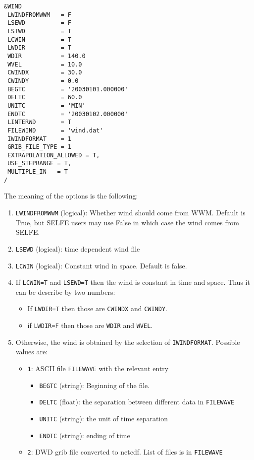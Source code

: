 \documentclass[12pt]{amsart}
\begin{document}
\begin{verbatim}
&WIND
 LWINDFROMWWM   = F      
 LSEWD          = F      
 LSTWD          = T      
 LCWIN          = T      
 LWDIR          = T      
 WDIR           = 140.0  
 WVEL           = 10.0   
 CWINDX         = 30.0   
 CWINDY         = 0.0    
 BEGTC          = '20030101.000000'
 DELTC          = 60.0             
 UNITC          = 'MIN'            
 ENDTC          = '20030102.000000'
 LINTERWD       = T                
 FILEWIND       = 'wind.dat'       
 IWINDFORMAT    = 1                
 GRIB_FILE_TYPE = 1
 EXTRAPOLATION_ALLOWED = T,
 USE_STEPRANGE = T,
 MULTIPLE_IN   = T 
/
\end{verbatim}
The meaning of the options is the following:
\begin{enumerate}
\item {\tt LWINDFROMWWM} (logical): Whether wind should come from WWM. Default is True, but SELFE users may use False in which case the wind comes from SELFE.
\item {\tt LSEWD} (logical): time dependent wind file
\item {\tt LCWIN} (logical): Constant wind in space. Default is false.
\item If {\tt LCWIN=T} and {\tt LSEWD=T} then the wind is constant in time and space. Thus it can be describe by two numbers:
  \begin{itemize}
  \item If {\tt LWDIR=T} then those are {\tt CWINDX} and {\tt CWINDY}.
  \item if {\tt LWDIR=F} then those are {\tt WDIR} and {\tt WVEL}.
  \end{itemize}
\item Otherwise, the wind is obtained by the selection of {\tt IWINDFORMAT}. Possible values are:
  \begin{itemize}
  \item {\tt 1}: ASCII file {\tt FILEWAVE} with the relevant entry
    \begin{itemize}
    \item {\tt BEGTC} (string): Beginning of the file.
    \item {\tt DELTC} (float): the separation between different data in {\tt FILEWAVE}
    \item {\tt UNITC} (string): the unit of time separation
    \item {\tt ENDTC} (string): ending of time 
    \end{itemize}
  \item {\tt 2}: DWD grib file converted to netcdf. List of files is in {\tt FILEWAVE}

\end{itemize}
\end{enumerate}
\end{document}
